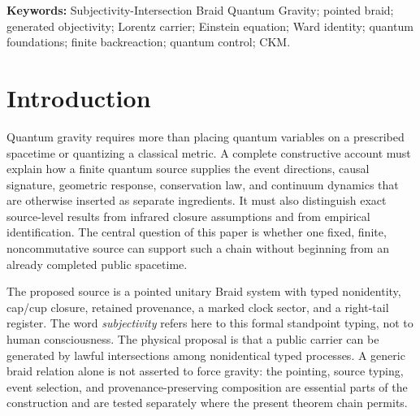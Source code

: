 \documentclass[11pt]{article}
\theoremstyle{definition}
\theoremstyle{remark}
\begin{document}
\begin{abstract}
The same finite source reconstructs a 36-dimensional complex carrier, source-dagger squared-norm probability, the observable algebra $M_{18}(\mathbb C)\oplus M_{18}(\mathbb C)$, and an exact finite quantum-control engine. A derived anomaly-solution groupoid supplies three anomaly-free Standard-Model character copies, global $\mathbb Z_6$, one weak Higgs doublet, and charged Yukawa interaction types. A preregistered rerun of the fixed calculation from the pointed-Braid source to a CKM modulus matrix passed all ten frozen tests and reproduced its frozen output with zero residual. All nine elements fell within the registered $5\sigma$ criterion of the frozen PDG 2024 table, while three clock-, pointing-, and pair-star-breaking controls changed the output. This is a registered reproducibility confirmation of a known derivation, not a new blind prediction. The construction connects quantum structure, geometry, conservation, gravity, and matter representations as outputs of one source architecture. It thereby refutes objectivist primacy as a universal necessity thesis without denying mind-independent reality.
\end{abstract}

\noindent\textbf{Keywords:} Subjectivity-Intersection Braid Quantum Gravity; pointed braid; generated objectivity; Lorentz carrier; Einstein equation; Ward identity; quantum foundations; finite backreaction; quantum control; CKM.

\section{Introduction}

Quantum gravity requires more than placing quantum variables on a prescribed
spacetime or quantizing a classical metric. A complete constructive account
must explain how a finite quantum source supplies the event directions,
causal signature, geometric response, conservation law, and continuum
dynamics that are otherwise inserted as separate ingredients. It must also
distinguish exact source-level results from infrared closure assumptions and
from empirical identification. The central question of this paper is whether
one fixed, finite, noncommutative source can support such a chain without
beginning from an already completed public spacetime.

The proposed source is a pointed unitary Braid system with typed nonidentity,
cap/cup closure, retained provenance, a marked clock sector, and a right-tail
register. The word \emph{subjectivity} refers here to this formal standpoint
typing, not to human consciousness. The physical proposal is that a public
carrier can be generated by lawful intersections among nonidentical typed
processes. A generic braid relation alone is not asserted to force gravity:
the pointing, source typing, event selection, and provenance-preserving
composition are essential parts of the construction and are tested separately
where the present theorem chain permits.
\end{document}
